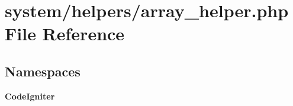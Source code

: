 \section{system/helpers/array\-\_\-helper.php File Reference}
\label{array__helper_8php}
\subsection*{Namespaces}
\begin{DoxyCompactItemize}
\item 
{\bf Code\-Igniter}
\end{DoxyCompactItemize}
